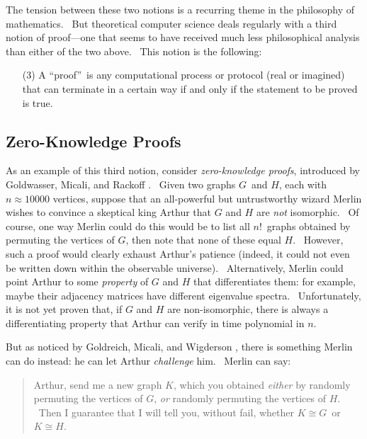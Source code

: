\documentclass[12pt,onecolumn]{article}%
\begin{document}
The tension between these two notions is a recurring theme in the philosophy
of mathematics. \ But theoretical computer science deals regularly with a
third notion of proof---one that seems to have received much less
philosophical analysis than either of the two above. \ This notion is the following:

\begin{enumerate}
\item[(3)] A \textquotedblleft proof\textquotedblright\ is any computational
process or protocol (real or imagined) that can terminate in a certain way if
and only if the statement to be proved is true.
\end{enumerate}

\subsection{Zero-Knowledge Proofs\label{ZKP}}

As an example of this third notion, consider \textit{zero-knowledge proofs},
introduced by Goldwasser, Micali, and Rackoff \cite{gmr}. \ Given two graphs
$G$\ and $H$, each with $n\approx10000$ vertices, suppose that an all-powerful
but untrustworthy wizard Merlin wishes to convince a skeptical king Arthur
that $G$ and $H$ are \textit{not} isomorphic. \ Of course, one way Merlin
could do this would be to list all $n!$\ graphs obtained by permuting the
vertices of $G$, then note that none of these equal $H$. \ However, such a
proof would clearly exhaust Arthur's patience (indeed, it could not even be
written down within the observable universe). \ Alternatively, Merlin could
point Arthur to some \textit{property} of $G$ and $H$ that differentiates
them: for example, maybe their adjacency matrices have different eigenvalue
spectra. \ Unfortunately, it is not yet proven that, if $G$ and $H$ are
non-isomorphic, there is always a differentiating property that Arthur can
verify in time polynomial in $n$.

But as noticed by Goldreich, Micali, and Wigderson \cite{gmw}, there is
something Merlin can do instead: he can let Arthur \textit{challenge} him.
\ Merlin can say:

\begin{quotation}
\noindent Arthur, send me a new graph $K$, which you obtained \textit{either}
by randomly permuting the vertices of $G$, \textit{or} randomly permuting the
vertices of $H$. \ Then I guarantee that I will tell you, without fail,
whether $K\cong G$\ or $K\cong H$.
\end{quotation}
\end{document}
